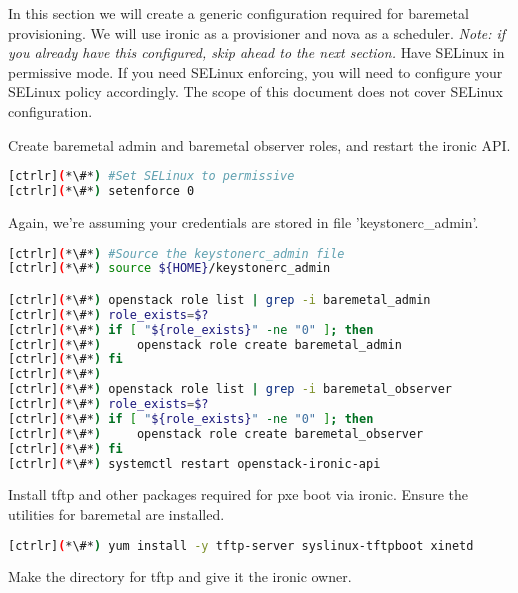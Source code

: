 	In this section we will create a generic configuration required for baremetal provisioning. We will use ironic as a provisioner and nova as a scheduler. {\em Note: if you already have this configured, skip ahead to the next section. }
	Have SELinux in permissive mode. If you need SELinux enforcing, you will need to configure your SELinux policy accordingly. The scope of this document does not cover SELinux configuration.

	Create baremetal admin and baremetal observer roles, and restart the ironic API.



\begin{lstlisting}[language=bash,keywords={}]
[ctrlr](*\#*) #Set SELinux to permissive
[ctrlr](*\#*) setenforce 0
\end{lstlisting}

	Again, we're assuming your credentials are stored in file 'keystonerc\_admin'.

\begin{lstlisting}[language=bash,keywords={}]
[ctrlr](*\#*) #Source the keystonerc_admin file
[ctrlr](*\#*) source ${HOME}/keystonerc_admin

[ctrlr](*\#*) openstack role list | grep -i baremetal_admin
[ctrlr](*\#*) role_exists=$?
[ctrlr](*\#*) if [ "${role_exists}" -ne "0" ]; then 
[ctrlr](*\#*)     openstack role create baremetal_admin
[ctrlr](*\#*) fi
[ctrlr](*\#*) 
[ctrlr](*\#*) openstack role list | grep -i baremetal_observer 
[ctrlr](*\#*) role_exists=$?
[ctrlr](*\#*) if [ "${role_exists}" -ne "0" ]; then
[ctrlr](*\#*)     openstack role create baremetal_observer
[ctrlr](*\#*) fi
[ctrlr](*\#*) systemctl restart openstack-ironic-api
\end{lstlisting} 

Install tftp and other packages required for pxe boot via ironic.
Ensure the utilities for baremetal are installed.


\begin{lstlisting}[language=bash,keywords={}]
[ctrlr](*\#*) yum install -y tftp-server syslinux-tftpboot xinetd
\end{lstlisting} 

Make the directory for tftp and give it the ironic owner.

